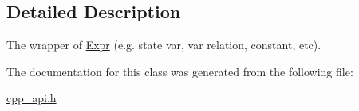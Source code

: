 \subsection{Detailed Description}
The wrapper of \mbox{\hyperlink{classilang_1_1_expr}{Expr}} (e.\+g. state var, var relation, constant, etc). 

The documentation for this class was generated from the following file\+:\begin{DoxyCompactItemize}
\item 
\mbox{\hyperlink{cpp__api_8h}{cpp\+\_\+api.\+h}}\end{DoxyCompactItemize}
